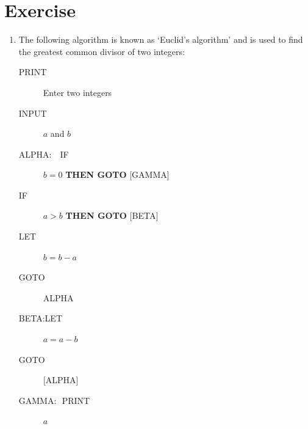 \documentclass[11pt,oneside]{article}
\newcounter{exercise}
\begin{document}
{{{{{{{{{\section*{Exercise \theexercise}\label{ex:if}
\begin{enumerate}[label=\arabic*.]
\item The following algorithm is known as `Euclid's algorithm' and is used to find the greatest common divisor of two integers:
\begin{description}
\item[\qquad\qquad \footnotesize\sffamily{} PRINT] Enter two integers \\[-1.75em]
\item[\qquad\qquad \footnotesize\sffamily{} INPUT] $a$ and $b$ \\[-1.75em]
\item[\footnotesize {\normalfont\sffamily{} ALPHA:} \;\,\, \sffamily{} IF] $b = 0$ \textbf{\footnotesize\sffamily{} THEN GOTO} {\footnotesize\sffamily{} [GAMMA]}\\[-1.75em]
\item[\qquad\qquad \footnotesize IF] $a > b$ \textbf{\footnotesize\sffamily{} THEN GOTO} {\footnotesize\sffamily{} [BETA]} \\[-1.75em]
\item[\qquad\qquad \footnotesize\sffamily{} LET] $b = b - a$ \\[-1.75em]
\item[\qquad\qquad \footnotesize\sffamily{} GOTO] {\footnotesize\sffamily{} ALPHA} \\[-1.75em]
\item[\footnotesize {\normalfont\sffamily{} BETA:}\qquad LET] $a = a - b$ \\[-1.75em]
\item[\qquad\qquad \footnotesize\sffamily{} GOTO] {\footnotesize\sffamily{} [ALPHA]} \\[-1.75em]
\item[\footnotesize {\normalfont\sffamily{} GAMMA:}\,\,{\sffamily{} PRINT}] $a$ 
\end{description}


\end{enumerate}}}}}}}}}}
\end{document}
